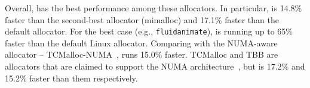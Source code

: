 
Overall, \NM{} has the best performance among these allocators. In particular, \NM{} is 14.8\% faster than the second-best allocator (mimalloc) and 17.1\% faster than the default allocator. %
For the best case (e.g., \texttt{fluidanimate}), \NM{} is running up to 65\% faster than the default Linux allocator.
Comparing with the NUMA-aware allocator -- TCMalloc-NUMA~\cite{tcmallocnew}, \NM{} runs 15.0\% faster. TCMalloc and TBB are allocators that are claimed to support the NUMA architecture~\cite{tcmalloc2, tbb3}, but \NM{} is 17.2\% and 15.2\% faster than them respectively.

